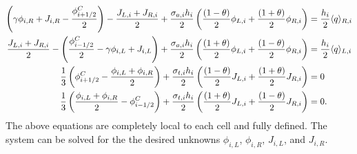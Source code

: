 \begin{align}
    \left(\gamma\phi_{i,R} + J_{i,R} - \frac{\phi_{{i+1/2}}^C}{2} \right) - \frac{J_{L,i} + J_{R,i}}{2} + \frac{\sigma_{a,i} h_i}{2} \left(
    \frac{(1-\theta)}{2} \phi_{L,i} +
    \frac{(1+\theta)}{2}\phi_{R,i}\right) &= \frac{h_i}{2} \langle q \rangle_{R,i} \\
    \frac{J_{L,i} + J_{R,i}}{2} -\left(\frac{\phi_{i-1/2}^C}{2} - \gamma \phi_{i,L} +
    J_{i,L}\right) + \frac{\sigma_{a,i} h_i}{2} \left(
    \frac{(1+\theta)}{2} \phi_{L,i} +
    \frac{(1-\theta)}{2}\phi_{R,i}\right) &= \frac{h_i}{2} \langle q \rangle_{L,i} 
    \\
    \frac{1}{3}\left(\phi_{i+1/2}^C - \frac{\phi_{i,L} + \phi_{i,R}}{2}\right) +
    \frac{\sigma_{t,i} h_i}{2}\left( \frac{(1-\theta)}{2} J_{L,i} +
    \frac{(1+\theta)}{2}J_{R,i}\right)    &= 0 \\
    \frac{1}{3}\left(\frac{\phi_{i,L} + \phi_{i,R}}{2} - \phi^C_{i-1/2} \right) +
    \frac{\sigma_{t,i} h_i}{2} \left( \frac{(1+\theta)}{2} J_{L,i} +
    \frac{(1-\theta)}{2}J_{R,i}\right) &= 0 .
\end{align}
The above equations are completely local to each cell and fully defined.  The system can be
solved for the the desired unknowns
$\phi_{i,L}$, $\phi_{i,R}$, $J_{i,L}$, and $J_{i,R}$.


